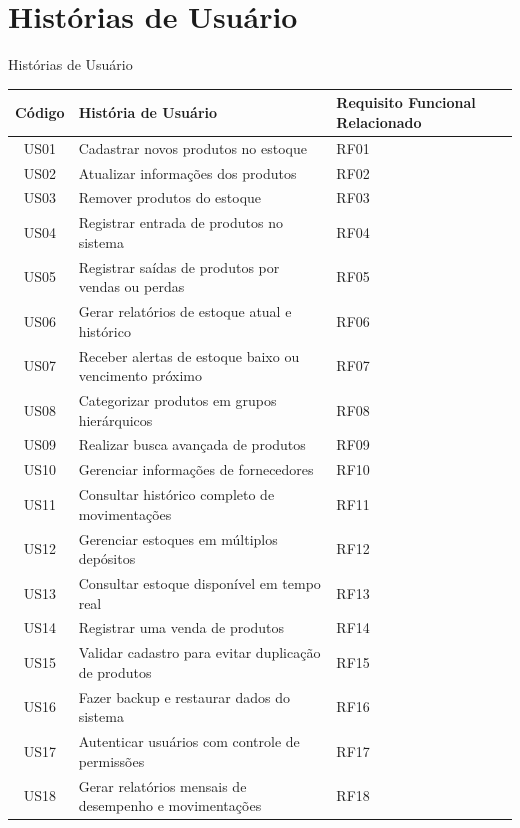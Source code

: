 \documentclass[
	12pt,				%
	openany,			%
	twoside,			%
	a4paper,			%
	english,			%
	brazil				%
	]{abntex2}
\begin{document}
\FloatBarrier




\newpage
\section{Histórias de Usuário}

\begin{quadro}[htb]
\caption{Histórias de Usuário}
\label{quadro_hist_usuarios}
\begin{tabular}{|c|p{10cm}|p{4cm}|}
\hline
\textbf{Código} & \textbf{História de Usuário} & \textbf{Requisito Funcional Relacionado} \\
\hline
US01 & Cadastrar novos produtos no estoque & RF01 \\ \hline
US02 & Atualizar informações dos produtos & RF02 \\ \hline
US03 & Remover produtos do estoque & RF03 \\ \hline
US04 & Registrar entrada de produtos no sistema & RF04 \\ \hline
US05 & Registrar saídas de produtos por vendas ou perdas & RF05 \\ \hline
US06 & Gerar relatórios de estoque atual e histórico & RF06 \\ \hline
US07 & Receber alertas de estoque baixo ou vencimento próximo & RF07 \\ \hline
US08 & Categorizar produtos em grupos hierárquicos & RF08 \\ \hline
US09 & Realizar busca avançada de produtos & RF09 \\ \hline
US10 & Gerenciar informações de fornecedores & RF10 \\ \hline
US11 & Consultar histórico completo de movimentações & RF11 \\ \hline
US12 & Gerenciar estoques em múltiplos depósitos & RF12 \\ \hline
US13 & Consultar estoque disponível em tempo real & RF13 \\ \hline
US14 & Registrar uma venda de produtos & RF14 \\ \hline
US15 & Validar cadastro para evitar duplicação de produtos & RF15 \\ \hline
US16 & Fazer backup e restaurar dados do sistema & RF16 \\ \hline
US17 & Autenticar usuários com controle de permissões & RF17 \\ \hline
US18 & Gerar relatórios mensais de desempenho e movimentações & RF18 \\
\hline
\end{tabular}
\end{quadro}
\end{document}
